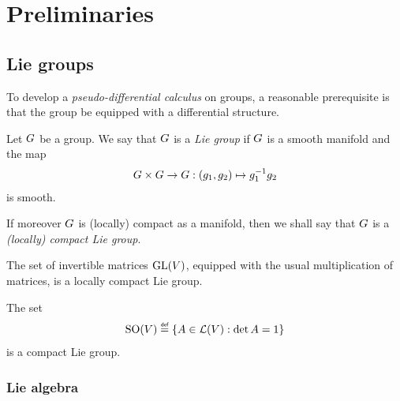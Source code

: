 \chapter{Preliminaries}

\section{Lie groups}

To develop a \emph{pseudo-differential calculus} on groups,
a reasonable prerequisite is that the group be equipped with a differential structure.

\begin{definition}
\label{definition:Lie_group}
    Let $G$ be a group.
    We say that $G$ is a \emph{Lie group}
    if $G$ is a smooth manifold and the map
    \begin{align*}
        G \times G \to G :
        (g_1, g_2) \mapsto g_1^{-1} g_2
    \end{align*}
    is smooth.

    If moreover $G$ is (locally) compact as a manifold,
    then we shall say that $G$ is a \emph{(locally) compact Lie group}.
\end{definition}

\begin{example}
    The set of invertible matrices $\mathrm{GL}(V)$,
    equipped with the usual multiplication of matrices,
    is a locally compact Lie group.
\end{example}

\begin{example}
    The set
    \begin{align*}
        \SpecialOrthogonalGroup \VectorSpace
        \defeq
        \{ A \in \Lin{\VectorSpace} : \det A = 1 \}
    \end{align*}
    is a compact Lie group.
\end{example}

\subsection{Lie algebra}

